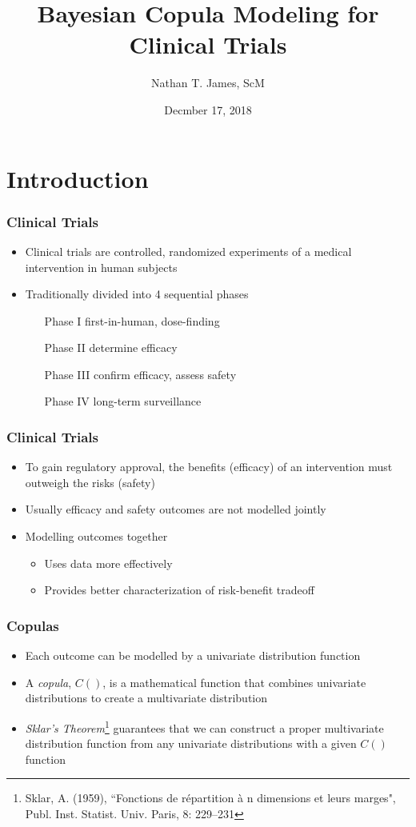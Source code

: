 \documentclass{beamer}
\title[Bayesian Copula Modeling for Clinical Trials]{Bayesian Copula Modeling for Clinical Trials}
\author{Nathan T. James, ScM}
\institute{Dept. of Biostatistics, Vanderbilt University}
\date{Decmber 17, 2018}
\begin{document}
	
	\frame{\titlepage}	
	
\section{Introduction}

	\begin{frame}
		\frametitle{Clinical Trials}
		\begin{itemize}
			\setlength\itemsep{2em}
			\item Clinical trials are controlled, randomized experiments of a medical intervention in human subjects
         	\item Traditionally divided into 4 sequential phases
				\begin{itemize}
					\setlength{\itemindent}{.5in}
					\item[Phase I] first-in-human, dose-finding
					\item[Phase II]  determine efficacy
					\item[Phase III]  confirm efficacy, assess safety
					\item[Phase IV] long-term surveillance
				\end{itemize}
	     \end{itemize}
	\end{frame}
	
	\begin{frame}
		\frametitle{Clinical Trials}
		\begin{itemize}
			\setlength\itemsep{2em}
			\item To gain regulatory approval, the benefits (efficacy) of an intervention must outweigh the risks (safety) 
			\item Usually efficacy and safety outcomes are not modelled jointly
			\item Modelling outcomes together
			\begin{itemize}
				\item Uses data more effectively 
				\item Provides better characterization of risk-benefit tradeoff
			\end{itemize}
		\end{itemize}
	\end{frame}
					
	\begin{frame}
		\frametitle{Copulas}
		\begin{itemize}
			\setlength\itemsep{2em}
			\item Each outcome can be modelled by a univariate distribution function
			\item A \emph{copula}, $C()$, is a mathematical function that combines univariate distributions to create a multivariate distribution
			\item \emph{Sklar's Theorem}\footnote{Sklar, A. (1959), ``Fonctions de  r\'epartition \`a n dimensions et leurs marges", Publ. Inst. Statist. Univ. Paris, 8: 229–231} guarantees that we can construct a proper multivariate distribution function from any univariate distributions with a given $C()$ function
		\end{itemize}
	\end{frame}
	
\end{document}
